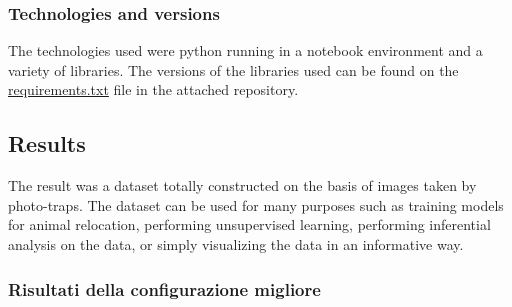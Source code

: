 \documentclass[12pt,a4paper,twoside]{article}
\begin{document}
\subsubsection{Technologies and versions}
The technologies used were python running in a notebook environment and a variety of libraries. The versions of the libraries used can be found on the \href{https://github.com/micheledinelli/aculei-ai}{requirements.txt} file in the attached repository.

\subsection{Results}
The result was a dataset totally constructed on the basis of images taken by photo-traps. The dataset can be used for many purposes such as training models for animal relocation, performing unsupervised learning, performing inferential analysis on the data, or simply visualizing the data in an informative way. \\ 

\subsubsection{Risultati della configurazione migliore}
\end{document}
